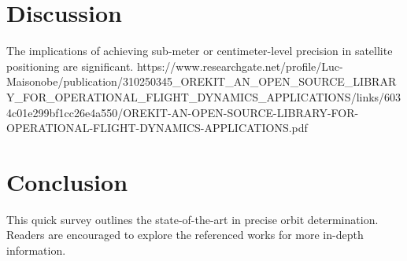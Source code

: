 \documentclass[a4paper,10pt]{article}
\begin{document}
\section{Discussion}
The implications of achieving sub-meter or centimeter-level precision in satellite positioning are significant.
https://www.researchgate.net/profile/Luc-Maisonobe/publication/310250345_OREKIT_AN_OPEN_SOURCE_LIBRARY_FOR_OPERATIONAL_FLIGHT_DYNAMICS_APPLICATIONS/links/6034c01e299bf1cc26e4a550/OREKIT-AN-OPEN-SOURCE-LIBRARY-FOR-OPERATIONAL-FLIGHT-DYNAMICS-APPLICATIONS.pdf

\section{Conclusion}
This quick survey outlines the state-of-the-art in precise orbit determination. Readers are encouraged to explore the referenced works for more in-depth information.

\newpage
\nocite{*} %
\printbibliography
\end{document}
